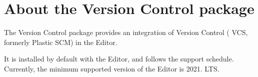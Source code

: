 \chapter{About the Version Control package}
\hypertarget{md__library_2_package_cache_2com_8unity_8collab-proxy_0d2_83_81_2_documentation_0i_2index}{}\label{md__library_2_package_cache_2com_8unity_8collab-proxy_0d2_83_81_2_documentation_0i_2index}
\label{md__library_2_package_cache_2com_8unity_8collab-proxy_0d2_83_81_2_documentation_0i_2index_autotoc_md148}%
%
 The Version Control package provides an integration of  Version Control ( VCS, formerly Plastic SCM) in the  Editor.

It is installed by default with the Editor, and follows the  support schedule. Currently, the minimum supported version of the  Editor is 2021. LTS.


\begin{DoxyItemize}
\item {}
\item {} 
\end{DoxyItemize}